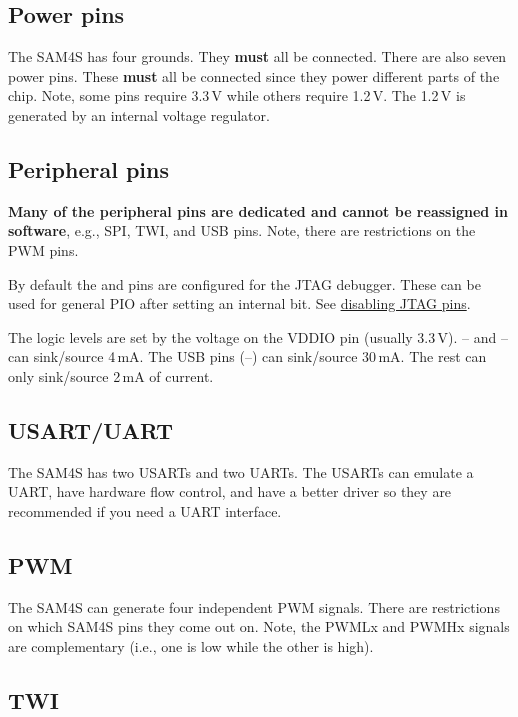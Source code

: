 \subsection{Power pins}\label{power-pins}

The SAM4S has four grounds. They \textbf{must} all be connected. There
are also seven power pins. These \textbf{must} all be connected since
they power different parts of the chip. Note, some pins require 3.3\,V
while others require 1.2\,V. The 1.2\,V is generated by an internal
voltage regulator.

\subsection{Peripheral pins}\label{peripheral-pins}

\textbf{Many of the peripheral pins are dedicated and cannot be
reassigned in software}, e.g., SPI, TWI, and USB pins. Note, there are
restrictions on the PWM pins.

By default the  and  pins are configured for the JTAG debugger.
These can be used for general PIO after setting an internal bit.  See
\protect\hyperref[disabling-jtag-pins]{disabling JTAG pins}.

The logic levels are set by the voltage on the VDDIO pin (usually
3.3\,V).  -- and -- can sink/source
4\,mA.  The USB pins (--) can sink/source 30\,mA.  The
rest can only sink/source 2\,mA of current.


\subsection{USART/UART}\label{usartuart}

The SAM4S has two USARTs and two UARTs. The USARTs can emulate a
UART, have hardware flow control, and have a better driver so they are
recommended if you need a UART interface.


\subsection{PWM}\label{pwm}

The SAM4S can generate four independent PWM signals. There are
restrictions on which SAM4S pins they come out on. Note, the PWMLx and
PWMHx signals are complementary (i.e., one is low while the other is
high).

\subsection{TWI}\label{twi}

